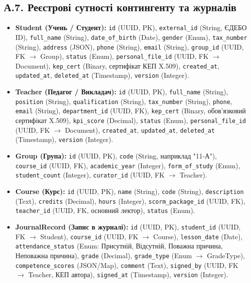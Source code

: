 \documentclass{article}
\begin{document}
\begin{appendix}
\subsection{А.7. Реєстрові сутності контингенту та журналів}
\begin{itemize}
    \item \textbf{Student (Учень / Студент):} \texttt{id} (UUID, PK), \texttt{external\_id} (String, ЄДЕБО ID), \texttt{full\_name} (String), \texttt{date\_of\_birth} (Date), \texttt{gender} (Enum), \texttt{tax\_number} (String), \texttt{address} (JSON), \texttt{phone} (String), \texttt{email} (String), \texttt{group\_id} (UUID, FK $\rightarrow$ Group), \texttt{status} (Enum), \texttt{personal\_file\_id} (UUID, FK $\rightarrow$ Document), \texttt{kep\_cert} (Binary, сертифікат КЕП X.509), \texttt{created\_at}, \texttt{updated\_at}, \texttt{deleted\_at} (Timestamp), \texttt{version} (Integer).
    \item \textbf{Teacher (Педагог / Викладач):} \texttt{id} (UUID, PK), \texttt{full\_name} (String), \texttt{position} (String), \texttt{qualification} (String), \texttt{tax\_number} (String), \texttt{phone}, \texttt{email} (String), \texttt{department\_id} (UUID, FK), \texttt{kep\_cert} (Binary, обов'язковий сертифікат X.509), \texttt{kpi\_score} (Decimal), \texttt{status} (Enum), \texttt{personal\_file\_id} (UUID, FK $\rightarrow$ Document), \texttt{created\_at}, \texttt{updated\_at}, \texttt{deleted\_at} (Timestamp), \texttt{version} (Integer).
    \item \textbf{Group (Група):} \texttt{id} (UUID, PK), \texttt{code} (String, наприклад "11-А"), \texttt{course\_id} (UUID, FK), \texttt{academic\_year} (Integer), \texttt{form\_of\_study} (Enum), \texttt{student\_count} (Integer), \texttt{curator\_id} (UUID, FK $\rightarrow$ Teacher).
    \item \textbf{Course (Курс):} \texttt{id} (UUID, PK), \texttt{name} (String), \texttt{code} (String), \texttt{description} (Text), \texttt{credits} (Decimal), \texttt{hours} (Integer), \texttt{scorm\_package\_id} (UUID, FK), \texttt{teacher\_id} (UUID, FK, основний лектор), \texttt{status} (Enum).
    \item \textbf{JournalRecord (Запис в журналі):} \texttt{id} (UUID, PK), \texttt{student\_id} (UUID, FK $\rightarrow$ Student), \texttt{course\_id} (UUID, FK $\rightarrow$ Course), \texttt{lesson\_date} (Date), \texttt{attendance\_status} (Enum: Присутній, Відсутній, Поважна причина, Неповажна причина), \texttt{grade} (Decimal), \texttt{grade\_type} (Enum $\rightarrow$ GradeType), \texttt{competence\_scores} (JSON/Map), \texttt{comment} (Text), \texttt{signed\_by} (UUID, FK $\rightarrow$ Teacher, КЕП автора), \texttt{signed\_at} (Timestamp), \texttt{version} (Integer).

\end{itemize}
\end{appendix}
\end{document}
